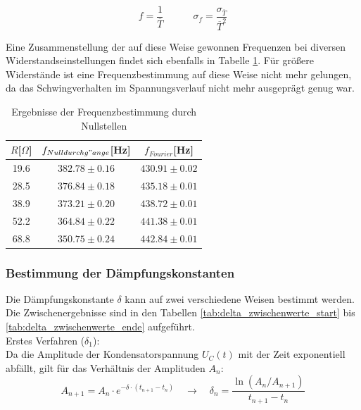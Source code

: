 \documentclass[12pt,a4paper]{article}
\begin{document}
\begin{equation}
f=\frac{1}{\overline{T}} \quad \quad \quad
\sigma_f=\frac{\sigma_{\overline{T}}}{\overline{T}^2}
\end{equation}

Eine Zusammenstellung der auf diese Weise gewonnen Frequenzen bei diversen Widerstandseinstellungen findet sich ebenfalls in Tabelle \ref{tab:Frequenzen}. Für größere Widerstände ist eine Frequenzbestimmung auf diese Weise nicht mehr gelungen, da das Schwingverhalten im Spannungsverlauf nicht mehr ausgeprägt genug war.

\begin{table}
\begin{center}
\begin{tabular}{|c|c|c|}
\hline
$R$[$\Omega$] & $f_{Nulldurchg"ange}$[Hz] & $f_{Fourier}$[Hz] \\
\hline
 19.6 & $382.78 \pm 0.16$ & $430.91 \pm 0.02$\\
\hline
 28.5 & $376.84 \pm 0.18$ & $435.18 \pm 0.01$\\
\hline
 38.9 & $373.21 \pm 0.20$ & $438.72 \pm 0.01$\\
\hline
 52.2 & $364.84 \pm 0.22$ & $441.38 \pm 0.01$\\
\hline
 68.8 & $350.75 \pm 0.24$ & $442.84 \pm 0.01$\\
\hline
\end{tabular}
\end{center}
\caption{Ergebnisse der Frequenzbestimmung durch Nullstellen}
\label{tab:Frequenzen}
\end{table}



\subsubsection{Bestimmung der Dämpfungskonstanten}
Die Dämpfungskonstante $\delta$ kann auf zwei verschiedene Weisen bestimmt werden. Die Zwischenergebnisse sind in den Tabellen \ref{tab:delta_zwischenwerte_start} bis \ref{tab:delta_zwischenwerte_ende} aufgeführt.\\

Erstes Verfahren ($\delta_1$):\\
Da die Amplitude der Kondensatorspannung $U_C(t)$ mit der Zeit exponentiell abfällt, gilt für das Verhältnis der Amplituden $A_n$:
\begin{equation}
A_{n+1} = A_n \cdot e^{-\delta \cdot (t_{n+1} - t_n)} \quad \rightarrow \quad \delta_n = \frac{\ln ( A_n / A_{n+1})}{t_{n+1}-t_n}
\end{equation}
\end{document}
